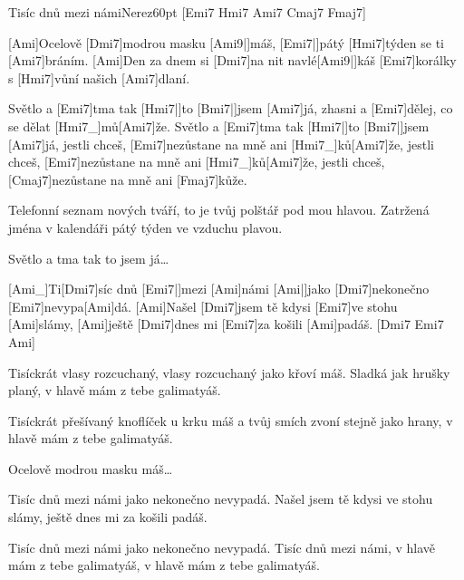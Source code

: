 \begin{song}{Tisíc dnů mezi námi}{Nerez}{60pt}
[\rl Emi7 Hmi7 Ami7 Cmaj7 Fmaj7]{}

%
[Ami]Ocelově [Dmi7]modrou masku [Ami9|]{máš,} [Emi7|]{pátý} [Hmi7]týden se ti [Ami7]bráním.
[Ami]Den za dnem si [Dmi7]na nit navlé[Ami9|]{káš} [Emi7]korálky s [Hmi7]vůní našich [Ami7]dlaní.

\chorus%
Světlo a [Emi7]tma tak [Hmi7|]{to} [Bmi7|]{jsem} [Ami7]já,
zhasni a [Emi7]dělej, co se dělat [Hmi7_]{mů}[Ami7]{že}.
Světlo a [Emi7]tma tak [Hmi7|]{to} [Bmi7|]{jsem} [Ami7]já,
jestli chceš, [Emi7]nezůstane na mně ani [Hmi7_]{ků}[Ami7]{že},
jestli chceš, [Emi7]nezůstane na mně ani [Hmi7_]{ků}[Ami7]{že},
jestli chceš, [Cmaj7]nezůstane na mně ani [Fmaj7]kůže.

%
Telefonní seznam nových tváří, to je tvůj polštář pod mou hlavou.
Zatržená jména v kalendáři pátý týden ve vzduchu plavou.

\chorus%
Světlo a tma tak to jsem já\dots


[Ami_]{Ti}[Dmi7]síc dnů [Emi7|]{mezi} [Ami]námi
[Ami|]{jako} [Dmi7]nekonečno [Emi7]nevypa[Ami]dá.
[Ami]Našel [Dmi7]jsem tě kdysi [Emi7]ve stohu [Ami]slámy,
[Ami]ještě [Dmi7]dnes mi [Emi7]za košili [Ami]padáš. [Dmi7 Emi7 Ami]{} 	  	 

Tisíckrát vlasy rozcuchaný, vlasy rozcuchaný jako křoví máš.
Sladká jak hrušky planý, v hlavě mám z tebe galimatyáš.

Tisíckrát přešívaný knoflíček u krku máš
a tvůj smích zvoní stejně jako hrany, v hlavě mám z tebe galimatyáš.


Ocelově modrou masku máš\dots

Tisíc dnů mezi námi jako nekonečno nevypadá.
Našel jsem tě kdysi ve stohu slámy, ještě dnes mi za košili padáš.

Tisíc dnů mezi námi jako nekonečno nevypadá.
Tisíc dnů mezi námi, v hlavě mám z tebe galimatyáš, v hlavě mám z tebe galimatyáš.
\end{song}
\vfil
\hfil{}
\vfil
\hfil{}
